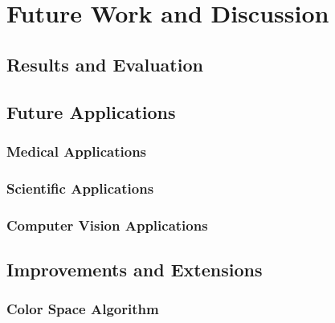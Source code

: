 
\chapter{Future Work and Discussion}

\ifpdf
    \graphicspath{{Chapter5/Figs/Raster/}{Chapter5/Figs/PDF/}{Chapter5/Figs/}}
\else
    \graphicspath{{Chapter5/Figs/Vector/}{Chapter5/Figs/}}
\fi
\section{Results and Evaluation}\label{sec:ResultsAndEvaluation}

\section{Future Applications}\label{sec:FutureApplications}


\subsection{Medical Applications}\label{sec:MedicalApplications}

\subsection{Scientific Applications}\label{sec:ScientificApplications}

\subsection{Computer Vision Applications}\label{sec:ComputerVisionApplications}

\section{Improvements and Extensions}\label{sec:ImprovementsAndExtensions}


\subsection{Color Space Algorithm}\label{sec:ColorSpaceAlgorithmImprovements}


